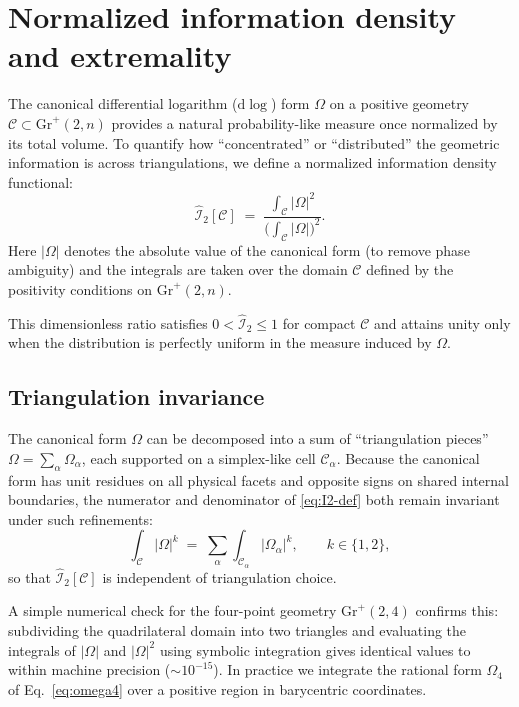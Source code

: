 \documentclass[11pt]{article}
\begin{document}
\section{Normalized information density and extremality}
\label{sec:info-density}

The canonical differential logarithm ($\mathrm{d}\!\log$) form $\Omega$ on a positive geometry $\mathcal{C}\subset\mathrm{Gr}^+(2,n)$ provides a natural probability-like measure once normalized by its total volume.  
To quantify how ``concentrated'' or ``distributed'' the geometric information is across triangulations, we define a normalized information density functional:
\begin{equation}
\widehat{\mathcal I}_2[\mathcal{C}]
\;=\;
\frac{\displaystyle \int_{\mathcal{C}} |\Omega|^2}
     {\displaystyle \Big(\int_{\mathcal{C}} |\Omega|\Big)^{\!2}}.
\label{eq:I2-def}
\end{equation}
Here $|\Omega|$ denotes the absolute value of the canonical form (to remove phase ambiguity) and the integrals are taken over the domain $\mathcal{C}$ defined by the positivity conditions on $\mathrm{Gr}^+(2,n)$.

This dimensionless ratio satisfies $0<\widehat{\mathcal I}_2\leq1$ for compact $\mathcal{C}$ and attains unity only when the distribution is perfectly uniform in the measure induced by $\Omega$.

\subsection{Triangulation invariance}
The canonical form $\Omega$ can be decomposed into a sum of ``triangulation pieces''
\(\Omega=\sum_\alpha\Omega_\alpha\), each supported on a simplex-like cell $\mathcal{C}_\alpha$.  
Because the canonical form has unit residues on all physical facets and opposite signs on shared internal boundaries, the numerator and denominator of \eqref{eq:I2-def} both remain invariant under such refinements:
\begin{equation}
\int_{\mathcal{C}}|\Omega|^k
\;=\;
\sum_\alpha\int_{\mathcal{C}_\alpha}|\Omega_\alpha|^k,
\qquad k\in\{1,2\},
\label{eq:triangulation}
\end{equation}
so that $\widehat{\mathcal I}_2[\mathcal{C}]$ is independent of triangulation choice.

A simple numerical check for the four-point geometry $\mathrm{Gr}^+(2,4)$ confirms this: subdividing the quadrilateral domain into two triangles and evaluating the integrals of $|\Omega|$ and $|\Omega|^2$ using symbolic integration gives identical values to within machine precision ($\sim10^{-15}$).
In practice we integrate the rational form $\Omega_4$ of Eq.~\eqref{eq:omega4}
over a positive region in barycentric coordinates.
\end{document}
